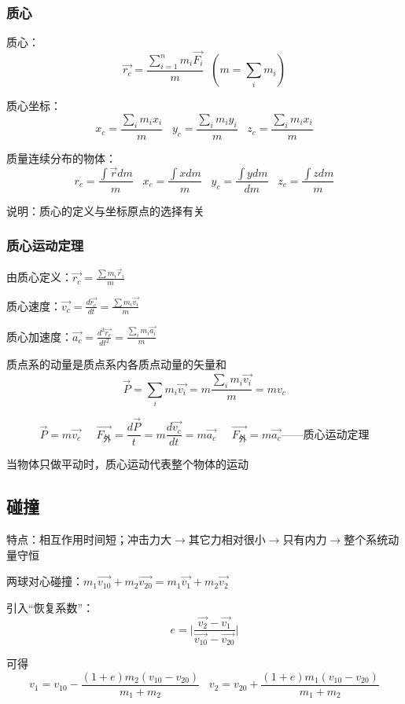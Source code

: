 \documentclass[UTF8]{article}
\begin{document}
\subsubsection{质心}

    质心：\[\vec{r_c} = \frac{\sum_{i=1}^n m_i\vec{F_i}}{m}\;\;(m = \sum_i m_i)\]

    质心坐标：\[x_c = \frac{\sum_i m_i x_i}{m}\;\;\;y_c = \frac{\sum_im_iy_i}{m}\;\;\;z_c = \frac{\sum_im_ix_i}{m}\]

    质量连续分布的物体：\[r_c = \frac{\int\vec{r}dm}{m}\;\;\;x_c = \frac{\int xdm}{m}\;\;\;y_c = \frac{\int ydm}{dm}\;\;\;z_c = \frac{\int zdm}{m}\]

    说明：质心的定义与坐标原点的选择有关

\subsubsection{质心运动定理}

    由质心定义：$\vec{r_c} = \frac{\sum m_i\vec r_i}{m}$
    
    质心速度：$\vec{v_c} = \frac{d\vec{r_c}}{dt} = \frac{\sum m_i\vec{v_i}}{m}$

    质心加速度：$\vec{a_c} = \frac{d^2\vec{r_c}}{dt^2} = \frac{\sum_i m_i\vec{a_i}}{m}$

    质点系的动量是质点系内各质点动量的矢量和
    \[\vec{P} = \sum_i m_i\vec{v_i} = m\frac{\sum_i m_i\vec{v_i}}{m} = mv_c\]

    \[\vec{P} = m\vec{v_c}\;\;\;\;\;\vec{F_{\mbox{外}}} = \frac{d\vec{P}}{t} = m\frac{d\vec{v_c}}{dt} = m\vec{a_c}\;\;\;\;\;\vec{F_{\mbox{外}}} = m\vec{a_c}\mbox{——质心运动定理}\]

    当物体只做平动时，质心运动代表整个物体的运动

\subsection{碰撞}

    特点：相互作用时间短；冲击力大$\rightarrow$其它力相对很小$\rightarrow$只有内力$\rightarrow$整个系统动量守恒

    两球对心碰撞：$m_1\vec{v_{10}} + m_2\vec{v_{20}} = m_1\vec{v_1} + m_2\vec{v_2}$

    引入“恢复系数”：\[e = \lvert \frac{\vec{v_2} - \vec{v_1}}{\vec{v_{10}} - \vec{v_{20}}} \rvert\]

    可得\[v_1 = v_{10} - \frac{(1+e)m_2(v_{10} - v_{20})}{m_1 + m_2}\;\;\;v_2 = v_{20} + \frac{(1+e)m_1(v_{10} - v_{20})}{m_1 + m_2}\]
\end{document}
